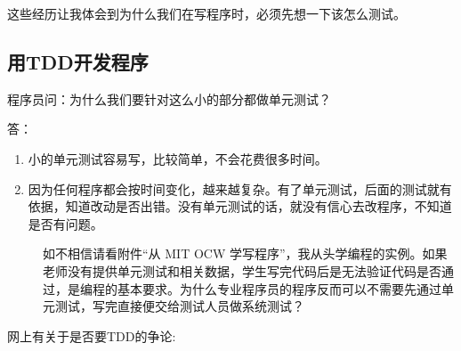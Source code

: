 

这些经历让我体会到为什么我们在写程序时，必须先想一下该怎么测试。

\hypertarget{ux7528tddux5f00ux53d1ux7a0bux5e8f}{%
\subsection{用TDD开发程序}\label{ux7528tddux5f00ux53d1ux7a0bux5e8f}}

程序员问：为什么我们要针对这么小的部分都做单元测试？

答：

\begin{enumerate}
\tightlist
\item
  小的单元测试容易写，比较简单，不会花费很多时间。
\item
  因为任何程序都会按时间变化，越来越复杂。有了单元测试，后面的测试就有依据，知道改动是否出错。没有单元测试的话，就没有信心去改程序，不知道是否有问题。
\end{enumerate}

\begin{description}
\item[]

如不相信请看附件“从 MIT OCW 学写程序”，我从头学编程的实例。如果老师没有提供单元测试和相关数据，学生写完代码后是无法验证代码是否通过，是编程的基本要求。为什么专业程序员的程序反而可以不需要先通过单元测试，写完直接便交给测试人员做系统测试？
\end{description}


网上有关于是否要TDD的争论:

